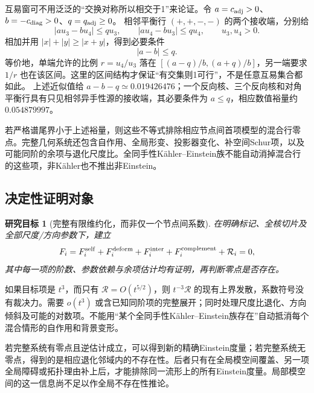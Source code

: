 \documentclass[UTF8,a4paper,11pt,fontset=fandol]{ctexart}
\numberwithin{equation}{section}
\newtheorem{target}[theorem]{研究目标}
\theoremstyle{definition}
\begin{document}
互易窗可不用泛泛的“交换对称所以相交于1”来论证。令
$a=c_{\rm adj}>0$、$b=-c_{\rm diag}>0$、$q=q_{\rm adj}\ge0$。
相邻平衡行 $(+,+,-,-)$ 的两个接收端，分别给
\[
|au_3-bu_4|\le qu_3,\qquad |au_4-bu_3|\le qu_4,
\qquad u_3,u_4>0.
\]
相加并用 $|x|+|y|\ge|x+y|$，得到必要条件
\[
|a-b|\le q.
\]
等价地，单端允许的比例 $r=u_4/u_3$ 落在
$[(a-q)/b,(a+q)/b]$，另一端要求 $1/r$ 也在该区间。这里的区间结构才保证“有交集则1可行”，不是任意互易集合都如此。
上述近似值给 $a-b-q\simeq0.019426476$；一个反向核、三个反向核和对角平衡行具有只见相邻异手性源的接收端，其必要条件为 $a\le q$，相应数值裕量约 $0.054879997$。

若严格谱尾界小于上述裕量，则这些不等式排除相应节点间首项模型的混合行零点。完整几何系统还包含自作用、全局形变、投影器变化、补空间Schur项，以及可能同阶的余项与退化尺度比。全同手性K\"ahler--Einstein族不能自动消掉混合行的这些项，非K\"ahler也不推出非Einstein。

\subsection{决定性证明对象}
\begin{target}[完整有限维约化，而非仅一个节点间系数]
在明确标记、全核切片及全部尺度/方向参数下，建立
\begin{equation}\label{eq:LS}
F_i=F_i^{\rm self}+F_i^{\rm deform}+F_i^{\rm inter}
+F_i^{\rm complement}+\mathcal R_i=0,
\end{equation}
其中每一项的阶数、参数依赖与余项估计均有证明，再判断零点是否存在。
\end{target}
如果目标项是 $t^3$，而只有 $\mathcal R=O(t^{5/2})$，则 $t^{-3}\mathcal R$ 的现有上界发散，系数符号没有裁决力。需要 $o(t^3)$ 或含已知同阶项的完整展开；同时处理尺度比退化、方向倾斜及可能的对数项。不能用“某个全同手性K\"ahler--Einstein族存在”自动抵消每个混合情形的自作用和背景变形。

若完整系统有零点且逆估计成立，可以得到新的精确Einstein度量；若完整系统无零点，得到的是相应退化邻域内的不存在性。后者只有在全局模空间覆盖、另一项全局障碍或拓扑理由补上后，才能排除同一流形上的所有Einstein度量。局部模空间的这一信息尚不足以作全局不存在性推论。
\end{document}
